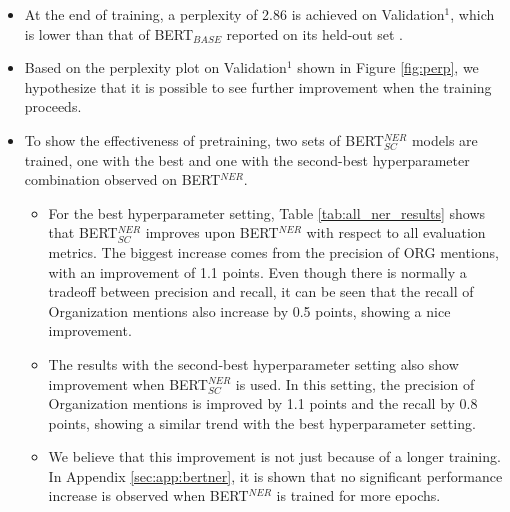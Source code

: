 \documentclass{report}
\theoremstyle{definition}
\theoremstyle{remark}
\begin{document}
\begin{itemize}
    \item At the end of training, a perplexity of 2.86 is achieved on Validation$^1$, which is lower than that of BERT$_{BASE}$ reported on its held-out set \cite{BERT}.
    \item Based on the perplexity plot on Validation$^1$ shown in Figure \ref{fig:perp}, we hypothesize that it is possible to see further improvement when the training proceeds.
    \item To show the effectiveness of pretraining, two sets of BERT$^{NER}_{SC}$ models are trained, one with the best and one with the second-best hyperparameter combination observed on BERT$^{NER}$. \begin{itemize}
        \item For the best hyperparameter setting, Table \ref{tab:all_ner_results} shows that BERT$^{NER}_{SC}$ improves upon BERT$^{NER}$ with respect to all evaluation metrics. The biggest increase comes from the precision of ORG mentions, with an improvement of 1.1 points. Even though there is normally a tradeoff between precision and recall, it can be seen that the recall of Organization mentions also increase by 0.5 points, showing a nice improvement. 
        \item The results with the second-best hyperparameter setting also show improvement when BERT$^{NER}_{SC}$ is used. In this setting, the precision of Organization mentions is improved by 1.1 points and the recall by 0.8 points, showing a similar trend with the best hyperparameter setting.
        \item We believe that this improvement is not just because of a longer training. In Appendix \ref{sec:app:bertner}, it is shown that no significant performance increase is observed when BERT$^{NER}$ is trained for more epochs.  
    \end{itemize}


\end{itemize}
\end{document}
